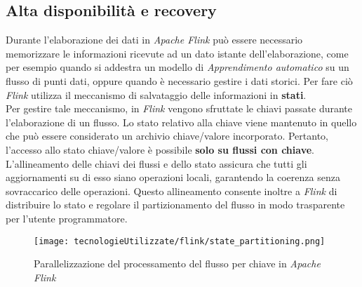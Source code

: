 \subsection{Alta disponibilità e recovery}
Durante l'elaborazione dei dati in \textit{Apache Flink} può essere necessario memorizzare le informazioni ricevute ad un dato istante dell'elaborazione, come per esempio quando si addestra un modello di \textit{\gls{Apprendimento automatico}} su un flusso di punti dati, oppure quando è necessario gestire i dati storici. Per fare ciò \textit{Flink} utilizza il meccanismo di salvataggio delle informazioni in \textbf{stati}.\\
Per gestire tale meccanismo, in \textit{Flink} vengono sfruttate le chiavi passate durante l'elaborazione di un flusso. Lo stato relativo alla chiave viene mantenuto in quello che può essere considerato un archivio chiave/valore incorporato. Pertanto, l'accesso allo stato chiave/valore è possibile \textbf{solo su flussi con chiave}. L'allineamento delle chiavi dei flussi e dello stato assicura che tutti gli aggiornamenti su di esso siano operazioni locali, garantendo la coerenza senza sovraccarico delle operazioni. Questo allineamento consente inoltre a \textit{Flink} di distribuire lo stato e regolare il partizionamento del flusso in modo trasparente per l'utente programmatore.

\begin{figure}[H] 
    \centering 
    \texttt{[image: tecnologieUtilizzate/flink/state\_partitioning.png]} 
    \caption{Parallelizzazione del processamento del flusso per chiave in \textit{Apache Flink}}
\end{figure}


